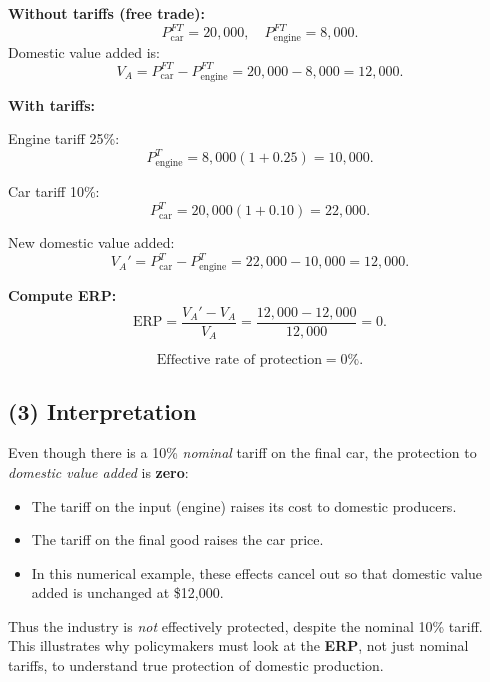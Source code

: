 \documentclass[12pt]{article}
\begin{document}
\textbf{Without tariffs (free trade):}
\[
P_{\text{car}}^{FT} = 20{,}000,\quad P_{\text{engine}}^{FT} = 8{,}000.
\]
Domestic value added is:
\[
V_A = P_{\text{car}}^{FT} - P_{\text{engine}}^{FT} = 20{,}000 - 8{,}000 = 12{,}000.
\]

\textbf{With tariffs:}

Engine tariff 25\%:
\[
P_{\text{engine}}^{T} = 8{,}000 (1 + 0.25) = 10{,}000.
\]

Car tariff 10\%:
\[
P_{\text{car}}^{T} = 20{,}000 (1 + 0.10) = 22{,}000.
\]

New domestic value added:
\[
V_A' = P_{\text{car}}^{T} - P_{\text{engine}}^{T} = 22{,}000 - 10{,}000 = 12{,}000.
\]

\textbf{Compute ERP:}
\[
\text{ERP} = \frac{V_A' - V_A}{V_A} 
= \frac{12{,}000 - 12{,}000}{12{,}000}= 0.
\]

\[
\boxed{\text{Effective rate of protection} = 0\%.}
\]

\subsection*{(3) Interpretation}

Even though there is a 10\% \emph{nominal} tariff on the final car, the protection to \emph{domestic value added} is \textbf{zero}:
\begin{itemize}
\item The tariff on the input (engine) raises its cost to domestic producers.
\item The tariff on the final good raises the car price.
\item In this numerical example, these effects cancel out so that domestic value added is unchanged at \$12,000.
\end{itemize}
Thus the industry is \emph{not} effectively protected, despite the nominal 10\% tariff. This illustrates why policymakers must look at the \textbf{ERP}, not just nominal tariffs, to understand true protection of domestic production.
\end{document}
